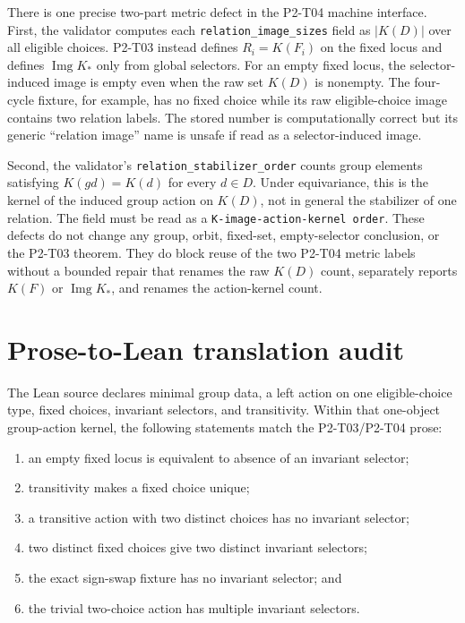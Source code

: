 \documentclass[11pt]{article}
\begin{document}
There is one precise two-part metric defect in the P2-T04 machine interface.
First, the validator computes each \texttt{relation\_image\_sizes} field as
\(\lvert K(D)\rvert\) over all eligible choices.  P2-T03 instead defines
\(R_i=K(F_i)\) on the fixed locus and defines \(\operatorname{Img}K_*\) only
from global selectors.  For an empty fixed locus, the selector-induced image
is empty even when the raw set \(K(D)\) is nonempty.  The four-cycle fixture,
for example, has no fixed choice while its raw eligible-choice image contains
two relation labels.  The stored number is computationally correct but its
generic ``relation image'' name is unsafe if read as a selector-induced image.

Second, the validator's \texttt{relation\_stabilizer\_order} counts group
elements satisfying \(K(gd)=K(d)\) for every \(d\in D\).  Under equivariance,
this is the kernel of the induced group action on \(K(D)\), not in general the
stabilizer of one relation.  The field must be read as a
\texttt{K-image-action-kernel order}.  These defects do not change any group,
orbit, fixed-set, empty-selector conclusion, or the P2-T03 theorem.  They do
block reuse of the two P2-T04 metric labels without a bounded repair that
renames the raw \(K(D)\) count, separately reports \(K(F)\) or
\(\operatorname{Img}K_*\), and renames the action-kernel count.

\section{Prose-to-Lean translation audit}

The Lean source declares minimal group data, a left action on one
eligible-choice type, fixed choices, invariant selectors, and transitivity.
Within that one-object group-action kernel, the following statements match the
P2-T03/P2-T04 prose:

\begin{enumerate}[label=(L\arabic*)]
  \item an empty fixed locus is equivalent to absence of an invariant selector;
  \item transitivity makes a fixed choice unique;
  \item a transitive action with two distinct choices has no invariant selector;
  \item two distinct fixed choices give two distinct invariant selectors;
  \item the exact sign-swap fixture has no invariant selector; and
  \item the trivial two-choice action has multiple invariant selectors.
\end{enumerate}
\end{document}
